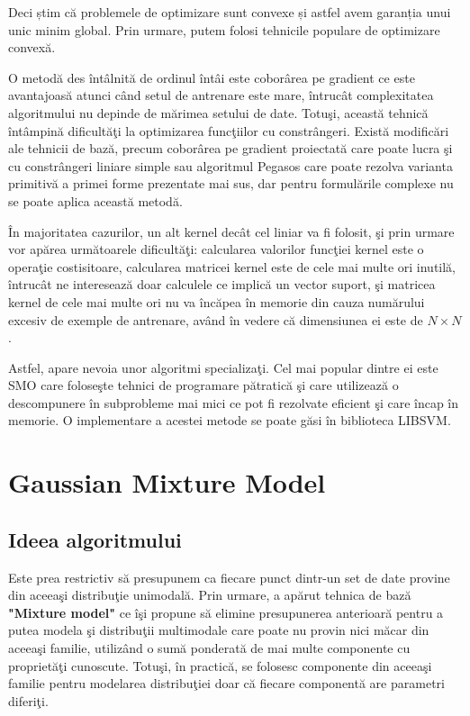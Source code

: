 Deci știm că problemele de optimizare
sunt convexe și astfel avem garanția unui unic minim global. 
Prin urmare, putem folosi 
tehnicile populare de optimizare convexă.

O metodă des întâlnită de ordinul întâi este coborârea pe gradient ce este 
avantajoasă atunci când setul de  antrenare este mare, întrucât 
complexitatea algoritmului nu depinde de mărimea setului de date.
Totuşi, această tehnică întâmpină dificultăţi la optimizarea funcţiilor 
cu constrângeri. Există modificări ale tehnicii de bază, precum coborârea pe 
gradient proiectată care poate lucra şi cu constrângeri liniare simple sau 
algoritmul Pegasos\cite{Pegasos} care poate rezolva varianta primitivă a primei forme prezentate 
mai sus, dar pentru formulările complexe nu se poate aplica această metodă.

În majoritatea cazurilor, un alt kernel decât cel liniar va fi folosit, şi prin urmare 
vor apărea următoarele dificultăţi: calcularea valorilor funcţiei kernel este 
o operaţie costisitoare, calcularea matricei kernel este de cele mai multe ori 
inutilă, întrucât ne interesează doar calculele ce implică un vector suport, şi 
matricea kernel de cele mai multe ori nu va încăpea în memorie din cauza 
numărului excesiv de exemple de antrenare, având în vedere că dimensiunea ei 
este de $N\times N$\cite{SVM-solvers}.

Astfel, apare nevoia unor algoritmi specializaţi. Cel mai popular dintre ei 
este SMO\cite{SMO} care foloseşte tehnici de programare pătratică şi care utilizează 
o descompunere în 
subprobleme mai mici ce pot fi rezolvate eficient şi care încap în memorie.
O implementare a acestei metode se poate găsi în biblioteca LIBSVM\cite{LIBSVM}.


\section{Gaussian Mixture Model}

\subsection{Ideea algoritmului}

Este prea restrictiv să presupunem ca fiecare punct dintr-un set de date 
provine din aceeaşi distribuţie unimodală. Prin urmare, a apărut tehnica de bază 
\textbf{"Mixture model"} ce îşi propune să elimine presupunerea anterioară pentru 
a putea modela şi distribuţii multimodale care poate nu provin nici măcar din aceeaşi 
familie, utilizând o sumă ponderată de mai multe componente cu proprietăţi
cunoscute. Totuşi, în practică, se folosesc componente din aceeaşi familie pentru 
modelarea distribuţiei doar că fiecare componentă are parametri diferiţi.


